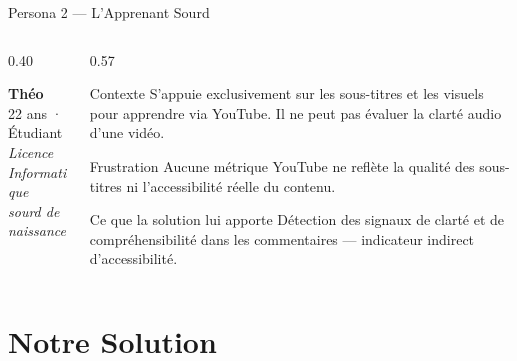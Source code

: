 \documentclass[aspectratio=169, 12pt]{beamer}
\begin{document}
\begin{frame}{Persona 2 — L'Apprenant Sourd}
  \begin{columns}[T]
    \begin{column}{0.40\textwidth}
      \begin{center}
        \vspace{0.5cm}
        {\LARGE\textcolor{mainblue}{\textbf{Théo}}}\\[0.3em]
        {\large 22 ans · Étudiant}\\[0.2em]
        \textit{Licence Informatique\\sourd de naissance}
      \end{center}
    \end{column}
    \begin{column}{0.57\textwidth}
      \begin{block}{Contexte}
        \small S'appuie exclusivement sur les sous-titres et les visuels
        pour apprendre via YouTube. Il ne peut pas évaluer la clarté
        audio d'une vidéo.
      \end{block}
      \vspace{0.2cm}
      \begin{alertblock}{Frustration}
        \small Aucune métrique YouTube ne reflète la qualité des
        sous-titres ni l'accessibilité réelle du contenu.
      \end{alertblock}
      \vspace{0.2cm}
      \begin{exampleblock}{Ce que la solution lui apporte}
        \small Détection des signaux de clarté et de compréhensibilité
        dans les commentaires — indicateur indirect d'accessibilité.
      \end{exampleblock}
    \end{column}
  \end{columns}
\end{frame}

\section{Notre Solution}
\end{document}

